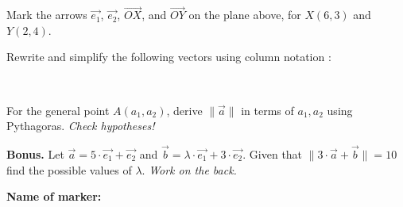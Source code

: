 \documentclass[9pt]{exam}
\begin{document}
\begin{questions} 
\question[4] Mark the arrows $\overrightarrow{e_1}$, $\overrightarrow{e_2}$, $\overrightarrow{OX}$, and $\overrightarrow{OY}$ on the plane above, for $X(6, 3)$ and $Y(2, 4)$.

\question[4] Rewrite and simplify the following vectors using column notation :

\


\question[3] For the general point $A(a_1, a_2)$, derive $\| \overrightarrow{a} \|$ in terms of $a_1, a_2$ using Pythagoras. \hfill \emph{Check hypotheses!}
\fillwithdottedlines{5cm}


\vfill

\question[0] \textbf{Bonus.} 
Let $\overrightarrow{a} = 5 \cdot \overrightarrow{e_1} + \overrightarrow{e_2}$ and $\overrightarrow{b} = \lambda \cdot \overrightarrow{e_1} + 3 \cdot \overrightarrow{e_2}$. \newline
Given that $\|3 \cdot \overrightarrow{a} + \overrightarrow{b}\| = 10$ find the possible values of $\lambda$.
\hfill \emph{Work on the back.}

\end{questions}


\begin{tcolorbox}

\textbf{Name of marker:}

\begin{center}
\gradetable[h][questions]
\end{center}

\end{tcolorbox}
\end{document}
